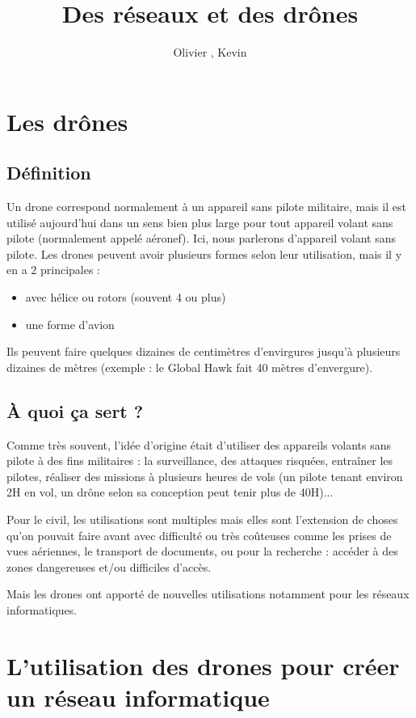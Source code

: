 \documentclass[a4paper,11pt]{report}
\title{Des réseaux et des drônes}
\author{Olivier \bsc{Boissard}, Kevin \bsc{Boulala}}
\date{}
\begin{document}
\maketitle
\tableofcontents

\chapter{Les drônes}
\section{Définition}
Un drone correspond normalement à un appareil sans pilote militaire, mais il est utilisé aujourd'hui dans un sens bien plus large pour tout appareil volant sans pilote (normalement appelé aéronef). Ici, nous parlerons d'appareil volant sans pilote. Les drones peuvent avoir plusieurs formes selon leur utilisation, mais il y en a 2 principales :
\begin{itemize}
  \item avec hélice ou rotors (souvent 4 ou plus)
  \item une forme d'avion
\end{itemize}
Ils peuvent faire quelques dizaines de centimètres d'envirgures jusqu'à plusieurs dizaines de mètres (exemple : le Global Hawk fait 40 mètres d'envergure).

\section{À quoi ça sert ?}
Comme très souvent, l'idée d'origine était d'utiliser des appareils volants sans pilote à des fins militaires : la surveillance, des attaques risquées, entraîner les pilotes, réaliser des missions à plusieurs heures de vols (un pilote tenant environ 2H en vol, un drône selon sa conception peut tenir plus de 40H)...

Pour le civil, les utilisations sont multiples mais elles sont l'extension de choses qu'on pouvait faire avant avec difficulté ou très coûteuses comme les prises de vues aériennes, le transport de documents, ou pour la recherche : accéder à des zones dangereuses et/ou difficiles d'accès.

Mais les drones ont apporté de nouvelles utilisations notamment pour les réseaux informatiques.

\chapter{L'utilisation des drones pour créer un réseau informatique}
\end{document}
